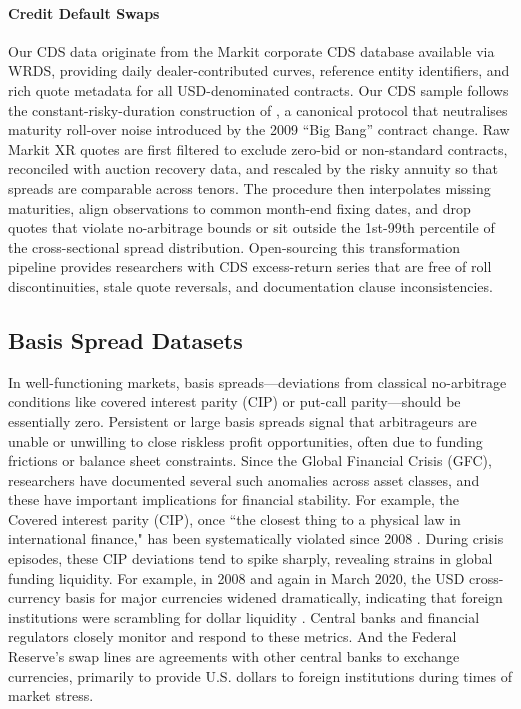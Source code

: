 \documentclass{article}
\begin{document}
\paragraph{Credit Default Swaps}
Our CDS data originate from the Markit corporate CDS database available via
WRDS, providing daily dealer-contributed curves, reference entity identifiers,
and rich quote metadata for all USD-denominated contracts. 
Our CDS sample follows the constant-risky-duration construction of
\cite{Palhares2012}, a canonical protocol that neutralises maturity roll-over
noise introduced by the 2009 ``Big Bang'' contract change. Raw Markit XR quotes
are first filtered to exclude zero-bid or non-standard contracts, reconciled
with auction recovery data, and rescaled by the risky annuity so that spreads
are comparable across tenors.  The procedure then interpolates missing
maturities, align observations to common month-end fixing dates, and drop quotes
that violate no-arbitrage bounds or sit outside the 1st-99th percentile of the
cross-sectional spread distribution. Open-sourcing this transformation pipeline
provides researchers with CDS excess-return series that are free of roll
discontinuities, stale quote reversals, and documentation clause
inconsistencies.

\subsection{Basis Spread Datasets}

In well-functioning markets, basis spreads---deviations from classical no-arbitrage conditions like covered interest parity (CIP) or put-call parity---should be essentially zero. Persistent or large basis spreads signal that arbitrageurs are unable or unwilling to close riskless profit opportunities, often due to funding frictions or balance sheet constraints. Since the Global Financial Crisis (GFC), researchers have documented several such anomalies across asset classes, and these have important implications for financial stability.
For example, the Covered interest parity (CIP), once ``the closest thing to a physical law in international finance," has been systematically violated since 2008 \cite{Du2018}.
During crisis episodes, these CIP deviations tend to spike sharply, revealing strains in global funding liquidity. For example, in 2008 and again in March 2020, the USD cross-currency basis for major currencies widened dramatically, indicating that foreign institutions were scrambling for dollar liquidity 
\citep{BoardofGovernorsoftheFederalReserveSystem2020}.
Central banks and financial regulators closely monitor and respond to these metrics.
And the Federal Reserve's swap lines are agreements with other central banks to exchange currencies, primarily to provide U.S. dollars to foreign institutions during times of market stress.
\end{document}
